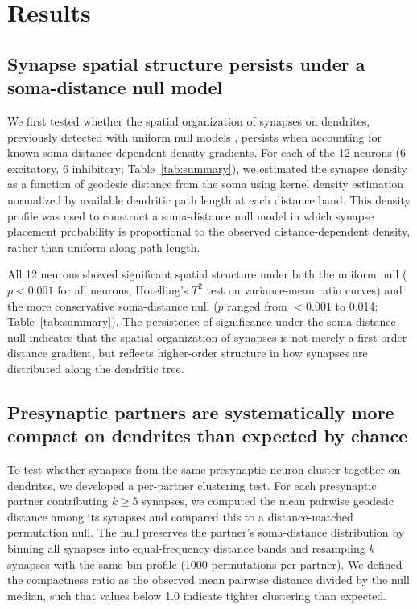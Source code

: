 \section{Results}

\subsection{Synapse spatial structure persists under a soma-distance null model}

We first tested whether the spatial organization of synapses on dendrites, previously detected with uniform null models \citep{neurostat}, persists when accounting for known soma-distance-dependent density gradients. For each of the 12 neurons (6 excitatory, 6 inhibitory; Table~\ref{tab:summary}), we estimated the synapse density as a function of geodesic distance from the soma using kernel density estimation normalized by available dendritic path length at each distance band. This density profile was used to construct a soma-distance null model in which synapse placement probability is proportional to the observed distance-dependent density, rather than uniform along path length.

All 12 neurons showed significant spatial structure under both the uniform null ($p < 0.001$ for all neurons, Hotelling's $T^2$ test on variance-mean ratio curves) and the more conservative soma-distance null ($p$ ranged from $< 0.001$ to 0.014; Table~\ref{tab:summary}). The persistence of significance under the soma-distance null indicates that the spatial organization of synapses is not merely a first-order distance gradient, but reflects higher-order structure in how synapses are distributed along the dendritic tree.

\subsection{Presynaptic partners are systematically more compact on dendrites than expected by chance}

To test whether synapses from the same presynaptic neuron cluster together on dendrites, we developed a per-partner clustering test. For each presynaptic partner contributing $k \geq 5$ synapses, we computed the mean pairwise geodesic distance among its synapses and compared this to a distance-matched permutation null. The null preserves the partner's soma-distance distribution by binning all synapses into equal-frequency distance bands and resampling $k$ synapses with the same bin profile (1000 permutations per partner). We defined the compactness ratio as the observed mean pairwise distance divided by the null median, such that values below 1.0 indicate tighter clustering than expected.

